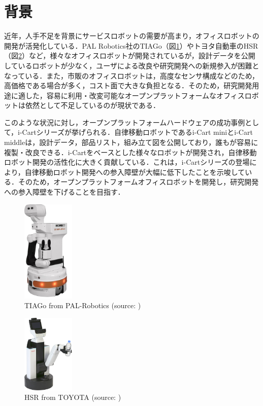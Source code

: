 
\section{背景}
近年，人手不足を背景にサービスロボットの需要が高まり，オフィスロボットの開発が活発化している．PAL Robotics社のTIAGo（図\ref{fig:TIAGo}）やトヨタ自動車のHSR（図\ref{fig:HSR}）など，様々なオフィスロボットが開発されているが，設計データを公開しているロボットが少なく，ユーザによる改良や研究開発への新規参入が困難となっている．また，市販のオフィスロボットは，高度なセンサ構成などのため，高価格である場合が多く，コスト面で大きな負担となる．そのため，研究開発用途に適した，容易に利用・改変可能なオープンプラットフォームなオフィスロボットは依然として不足しているのが現状である．

このような状況に対し，オープンプラットフォームハードウェアの成功事例として，i-Cartシリーズが挙げられる．自律移動ロボットであるi-Cart miniとi-Cart middleは，設計データ，部品リスト，組み立て図を公開しており，誰もが容易に複製・改良できる．i-Cartをベースとした様々なロボットが開発され，自律移動ロボット開発の活性化に大きく貢献している．これは，i-Cartシリーズの登場により，自律移動ロボット開発への参入障壁が大幅に低下したことを示唆している．そのため，オープンプラットフォームオフィスロボットを開発し，研究開発への参入障壁を下げることを目指す．

\begin{figure}[h]
  \centering
  \includegraphics[width=25mm]{images/png/TIAGo.png}
  \caption{TIAGo from PAL-Robotics (source: \cite{TIAGo:online})}
  \label{fig:TIAGo}
\end{figure}
\begin{figure}[h]
  \centering
  \includegraphics[width=25mm]{images/png/HSR.png}
  \caption{HSR from TOYOTA (source: \cite{HSR:online})}
  \label{fig:HSR}
\end{figure}

